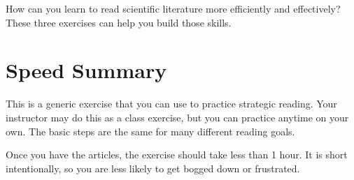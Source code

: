 \documentclass[
]{book}
\begin{document}
How can you learn to read scientific literature more efficiently and effectively? These three exercises can help you build those skills.

\hypertarget{speed-summary}{%
\section{Speed Summary}\label{speed-summary}}

This is a generic exercise that you can use to practice strategic reading. Your instructor may do this as a class exercise, but you can practice anytime on your own. The basic steps are the same for many different reading goals.

Once you have the articles, the exercise should take less than 1 hour. It is short intentionally, so you are less likely to get bogged down or frustrated.
\end{document}
